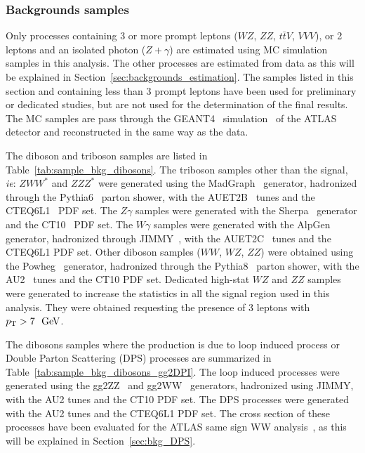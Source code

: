 
\newpage

\subsubsection{Backgrounds samples}
\label{sec:subsection_datasets_MC}

Only processes containing 3 or more prompt
leptons ($WZ$, $ZZ$, $t\bar{t}V$, $VVV$), or 2 leptons and an 
isolated photon ($Z+\gamma$) are estimated using MC simulation 
samples in this analysis. The other processes are estimated from 
data as this will be explained in Section~\ref{sec:backgrounds_estimation}. 
The samples listed in this section and containing less than 3 prompt leptons 
have been used for preliminary or dedicated studies, but are not used for 
the determination of the final results. The MC samples are pass through the 
GEANT4~\cite{Agostinelli:2002hh} simulation~\cite{Aad:2010ah} of the ATLAS 
detector and reconstructed in the same way as the data.

The diboson and triboson samples are listed in Table~\ref{tab:sample_bkg_dibosons}. The triboson samples other than the signal, \textit{ie}: $ZWW^{*}$ and $ZZZ^{*}$ were generated using the MadGraph~\cite{Alwall_madgraph} generator, hadronized through the Pythia6~\cite{PYTHIA} parton shower, with the AUET2B~\cite{ATL-PHYS-PUB-2011-009} tunes and the CTEQ6L1~\cite{Pumplin:2002vw} PDF set. The $Z\gamma$ samples were generated with the Sherpa~\cite{sherpa} generator and the CT10~\cite{Guzzi:2011sv} PDF set. The $W\gamma$ samples were generated with the AlpGen~\cite{ALPGEN} generator, hadronized through JIMMY~\cite{Jimmy}, with the AUET2C~\cite{ATL-PHYS-PUB-2011-009} tunes and the CTEQ6L1 PDF set. Other diboson samples ($WW$, $WZ$, $ZZ$) were obtained using the Powheg~\cite{Alioli:2008gx,Nason:2004rx,Frixione:2007vw,Alioli:2010xd} generator, hadronized through the Pythia8~\cite{Sjostrand:2007gs} parton shower, with the AU2~\cite{atlasmctunes} tunes and the CT10 PDF set. Dedicated high-stat $WZ$ and $ZZ$ samples were generated to increase the statistics in all the signal region used in this analysis. They were obtained requesting the presence of 3 leptons with $\pt>7~\GeV$.

The dibosons samples where the production is due to loop induced process or Double Parton Scattering (DPS) processes are summarized in Table~\ref{tab:sample_bkg_dibosons_gg2DPI}. The loop induced processes were generated using the gg2ZZ~\cite{Binoth:2008pr} and gg2WW~\cite{Binoth:2006mf} generators, hadronized using JIMMY, with the AU2 tunes and the CT10 PDF set. The DPS processes were generated with the AU2 tunes and the CTEQ6L1 PDF set. The cross section of these processes have been evaluated for the ATLAS same sign WW analysis~\cite{Aad:2014zda}, as this will be explained in Section~\ref{sec:bkg_DPS}.

